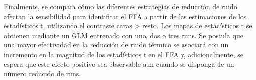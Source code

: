 Finalmente, se compara cómo las diferentes estrategias de reducción de ruido afectan la sensibilidad para identificar el FFA a partir de las estimaciones de los estadísticos t, utilizando el contraste caras > resto. Los mapas de estadísticos t se obtienen mediante un GLM entrenado con uno, dos o tres runs. Se postula que una mayor efectividad en la reducción de ruido térmico se asociará con un incremento en la magnitud de los estadísticos t en el FFA y, adicionalmente, se espera que este efecto positivo sea observable aun cuando se disponga de un número reducido de runs.